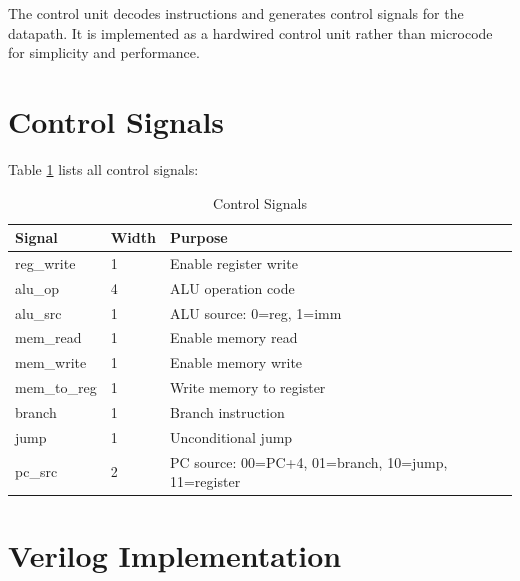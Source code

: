 \documentclass[12pt,a4paper,oneside]{book}
\begin{document}
The control unit decodes instructions and generates control signals for the datapath. It is implemented as a hardwired control unit rather than microcode for simplicity and performance.

\section{Control Signals}

Table \ref{tab:control-signals} lists all control signals:

\begin{table}[H]
\centering
\caption{Control Signals}
\label{tab:control-signals}
\small
\begin{tabularx}{\textwidth}{|l|l|X|}
\hline
\textbf{Signal} & \textbf{Width} & \textbf{Purpose} \\
\hline
reg\_write & 1 & Enable register write \\
alu\_op & 4 & ALU operation code \\
alu\_src & 1 & ALU source: 0=reg, 1=imm \\
mem\_read & 1 & Enable memory read \\
mem\_write & 1 & Enable memory write \\
mem\_to\_reg & 1 & Write memory to register \\
branch & 1 & Branch instruction \\
jump & 1 & Unconditional jump \\
pc\_src & 2 & PC source: 00=PC+4, 01=branch, 10=jump, 11=register \\
\hline
\end{tabularx}
\end{table}

\section{Verilog Implementation}
\end{document}
